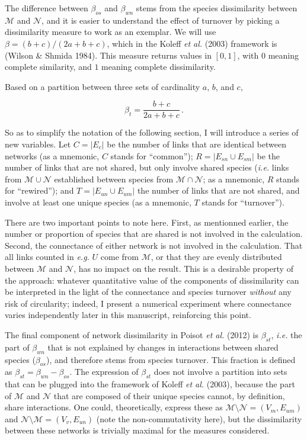 \documentclass[10pt,oneside]{article}
\begin{document}
The difference between \(\beta_{os}\) and \(\beta_{wn}\) stems from the
species dissimilarity between \(\mathcal{M}\) and \(\mathcal{N}\), and
it is easier to understand the effect of turnover by picking a
dissimilarity measure to work as an exemplar. We will use
\(\beta = (b+c)/(2a+b+c)\), which in the Koleff \emph{et al.} (2003)
framework is (Wilson \& Shmida 1984). This measure returns values in
\([0,1]\), with \(0\) meaning complete similarity, and \(1\) meaning
complete dissimilarity.

Based on a partition between three sets of cardinality \(a\), \(b\), and
\(c\),

\[\beta_t = \frac{b+c}{2a+b+c}\,.\]

So as to simplify the notation of the following section, I will
introduce a series of new variables. Let \(C = |E_c|\) be the number of
links that are identical between networks (as a mnemonic, \(C\) stands
for ``common''); \(R = |E_{sn} \cup E_{sm}|\) be the number of links
that are not shared, but only involve shared species (\emph{i.e.} links
from \(\mathcal{M}\cup\mathcal{N}\) established between species from
\(\mathcal{M}\cap\mathcal{N}\); as a mnemonic, \(R\) stands for
``rewired''); and \(T = |E_{un} \cup E_{um}|\) the number of links that
are not shared, and involve at least one unique species (as a mnemonic,
\(T\) stands for ``turnover'').

There are two important points to note here. First, as mentionned
earlier, the number or proportion of species that are shared is not
involved in the calculation. Second, the connectance of either network
is not involved in the calculation. That all links counted in
\emph{e.g.} \(U\) come from \(\mathcal{M}\), or that they are evenly
distributed between \(\mathcal{M}\) and \(\mathcal{N}\), has no impact
on the result. This is a desirable property of the approach: whatever
quantitative value of the components of dissimilarity can be interpreted
in the light of the connectance and species turnover \emph{without} any
risk of circularity; indeed, I present a numerical experiment where
connectance varies independently later in this manuscript, reinforcing
this point.

The final component of network dissimilarity in Poisot \emph{et al.}
(2012) is \(\beta_{st}\), \emph{i.e.} the part of \(\beta_{wn}\) that is
not explained by changes in interactions between shared species
(\(\beta_{os}\)), and therefore stems from species turnover. This
fraction is defined as \(\beta_{st} = \beta_{wn}-\beta_{os}\). The
expression of \(\beta_{st}\) does not involve a partition into sets that
can be plugged into the framework of Koleff \emph{et al.} (2003),
because the part of \(\mathcal{M}\) and \(\mathcal{N}\) that are
composed of their unique species cannot, by definition, share
interactions. One could, theoretically, express these as
\(\mathcal{M} \setminus \mathcal{N} = (V_m, E_{um})\) and
\(\mathcal{N} \setminus \mathcal{M} = (V_v, E_{un})\) (note the
non-commutativity here), but the dissimilarity between these networks is
trivially maximal for the measures considered.
\end{document}
